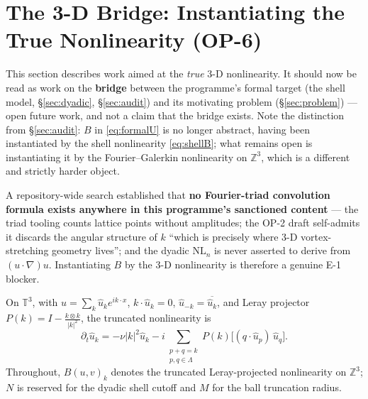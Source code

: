 \documentclass[11pt,a4paper]{article}
\newcommand{\T}{\mathbb{T}}
\newcommand{\Z}{\mathbb{Z}}
\theoremstyle{definition}
\theoremstyle{plain}
\begin{document}
\section{The 3-D Bridge: Instantiating the True Nonlinearity (OP-6)}
\label{sec:opsix}

This section describes work aimed at the \emph{true} 3-D nonlinearity. It should now be read
as work on the \textbf{bridge} between the programme's formal target (the shell model,
\S\ref{sec:dyadic}, \S\ref{sec:audit}) and its motivating problem (\S\ref{sec:problem}) ---
open future work, and not a claim that the bridge exists. Note the distinction from
\S\ref{sec:audit}: $B$ in \eqref{eq:formalU} is no longer abstract, having been instantiated
by the shell nonlinearity \eqref{eq:shellB}; what remains open is instantiating it by the
Fourier--Galerkin nonlinearity on $\Z^3$, which is a different and strictly harder object.

A repository-wide search established that \textbf{no Fourier-triad convolution
formula exists anywhere in this programme's sanctioned content} --- the triad tooling counts
lattice points without amplitudes; the OP-2 draft self-admits it discards the angular
structure of $k$ ``which is precisely where 3-D vortex-stretching geometry lives''; and the
dyadic $\mathrm{NL}_n$ is never asserted to derive from $(u\cdot\nabla)u$. Instantiating $B$
by the 3-D nonlinearity is therefore a genuine E-1 blocker.

On $\T^3$, with $u=\sum_k\hat u_ke^{ik\cdot x}$, $k\cdot\hat u_k=0$,
$\hat u_{-k}=\overline{\hat u_k}$, and Leray projector
$P(k)=I-\frac{k\otimes k}{|k|^2}$, the truncated nonlinearity is
\begin{equation}
\partial_t\hat u_k = -\nu|k|^2\hat u_k
- i\!\!\sum_{\substack{p+q=k\\ p,q\in\Lambda}}\!\! P(k)\bigl[(q\cdot\hat u_p)\,\hat u_q\bigr].
\label{eq:fourier}
\end{equation}
Throughout, $B(u,v)_k$ denotes the truncated Leray-projected nonlinearity on $\Z^3$; $N$ is
reserved for the dyadic shell cutoff and $M$ for the ball truncation radius.
\end{document}
